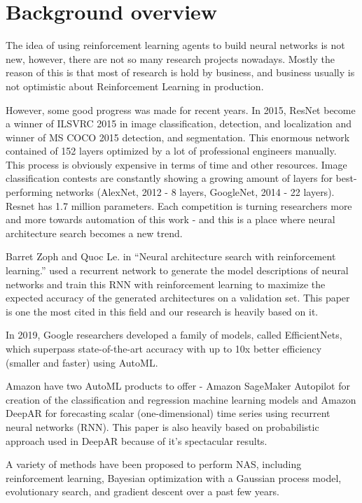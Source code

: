 \chapter{Background overview}

The idea of using reinforcement learning agents to build neural networks is not new, however, there are not so many research projects nowadays. Mostly the reason of this is that most of research is hold by business, and business usually is not optimistic about Reinforcement Learning in production.

However, some good progress was made for recent years. In 2015, ResNet become a winner of ILSVRC 2015 in image classification, detection, and localization and winner of MS COCO 2015 detection, and segmentation. This enormous network contained of 152 layers optimized by a lot of professional engineers manually. This process is obviously expensive in terms of time and other resources. Image classification contests are constantly showing a growing amount of layers for best-performing networks (AlexNet, 2012 - 8 layers, GoogleNet, 2014 - 22 layers). Resnet has 1.7 million parameters. Each competition is turning researchers more and more towards automation of this work - and this is a place where neural architecture search becomes a new trend.

Barret Zoph and Quoc Le. in “Neural architecture search with reinforcement learning.” used a recurrent network to generate the model descriptions of neural networks and train this RNN with reinforcement learning to maximize the expected accuracy of the generated architectures on a validation set. This paper is one the most cited in this field and our research is heavily based on it.

In 2019, Google researchers developed a family of models, called EfficientNets, which superpass state-of-the-art accuracy with up to 10x better efficiency (smaller and faster) using AutoML.

Amazon have two AutoML products to offer - Amazon SageMaker Autopilot for creation of the classification and regression machine learning models and Amazon DeepAR for forecasting scalar (one-dimensional) time series using recurrent neural networks (RNN). This paper is also heavily based on probabilistic approach used in DeepAR because of it’s spectacular results.

A variety of methods have been proposed to perform NAS, including reinforcement learning, Bayesian optimization with a Gaussian process model, evolutionary search, and gradient descent over a past few years.